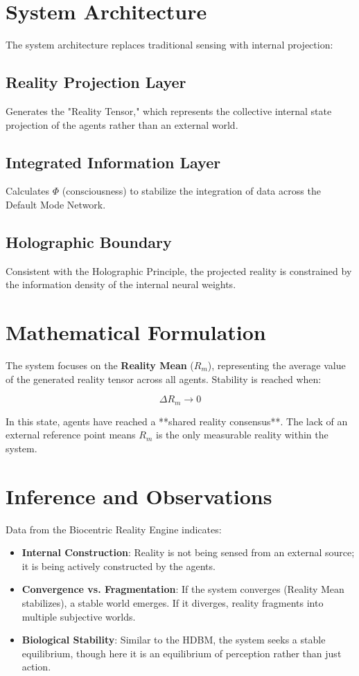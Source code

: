 \documentclass[12pt]{article}
\begin{document}
\section{System Architecture}

The system architecture replaces traditional sensing with internal projection:

\subsection{Reality Projection Layer}
Generates the "Reality Tensor," which represents the collective internal state projection of the agents rather than an external world.

\subsection{Integrated Information Layer}
Calculates $\Phi$ (consciousness) to stabilize the integration of data across the Default Mode Network.

\subsection{Holographic Boundary}
Consistent with the Holographic Principle, the projected reality is constrained by the information density of the internal neural weights.

\section{Mathematical Formulation}

The system focuses on the \textbf{Reality Mean} ($R_m$), representing the average value of the generated reality tensor across all agents. Stability is reached when:

\[
\Delta R_m \rightarrow 0
\]

In this state, agents have reached a **shared reality consensus**. The lack of an external reference point means $R_m$ is the only measurable reality within the system.

\section{Inference and Observations}

Data from the Biocentric Reality Engine indicates:
\begin{itemize}
\item \textbf{Internal Construction}: Reality is not being sensed from an external source; it is being actively constructed by the agents.
\item \textbf{Convergence vs. Fragmentation}: If the system converges (Reality Mean stabilizes), a stable world emerges. If it diverges, reality fragments into multiple subjective worlds.
\item \textbf{Biological Stability}: Similar to the HDBM, the system seeks a stable equilibrium, though here it is an equilibrium of perception rather than just action.
\end{itemize}
\end{document}
